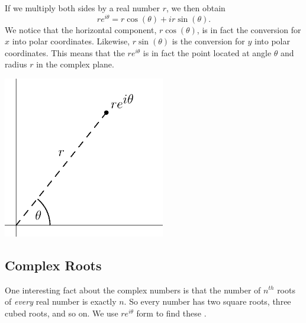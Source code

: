 If we multiply both sides by a real number $r$, we then obtain $$ re^{i\theta}=r\cos(\theta)+ir\sin(\theta).$$
We notice that the horizontal component, $r\cos(\theta)$, is in fact the conversion for $x$ into polar coordinates.  Likewise, $r\sin(\theta)$ is the conversion for $y$ into polar coordinates.  This means that the  $re^{i\theta}$ is in fact the point located at angle $\theta $ and radius $r$ in the complex plane.  
\begin{center}	\includegraphics[width=200pt]{ChapterComplex/Figures/polarcart.eps}
\end{center}

\subsection{Complex Roots}
 
One interesting fact about the complex numbers is that the number of $n^{th}$ roots of \emph{every} real number is exactly $n$.  So every number has two square roots, three cubed roots, and so on.  We use $re^{i\theta}$ form to find these .

